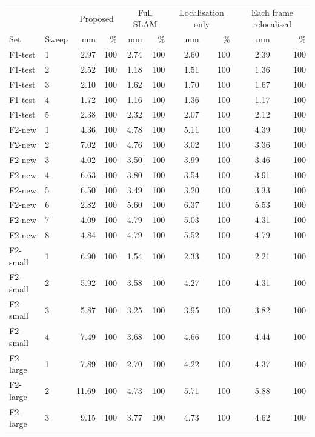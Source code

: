\begin{longtable}{llrrrrrrrr}
\toprule
 & & \multicolumn{2}{c}{Proposed} & \multicolumn{2}{c}{Full SLAM} & \multicolumn{2}{c}{Localisation only} & \multicolumn{2}{c}{Each frame relocalised}\\
Set & Sweep & mm & \% & mm & \% & mm & \% & mm & \%\\
\midrule
\endhead
\bottomrule
\endfoot
F1-test & 1 & 2.97 & 100 & 2.74 & 100 & 2.60 & 100 & 2.39 & 100\\
F1-test & 2 & 2.52 & 100 & 1.18 & 100 & 1.51 & 100 & 1.36 & 100\\
F1-test & 3 & 2.10 & 100 & 1.62 & 100 & 1.70 & 100 & 1.67 & 100\\
F1-test & 4 & 1.72 & 100 & 1.16 & 100 & 1.36 & 100 & 1.17 & 100\\
F1-test & 5 & 2.38 & 100 & 2.32 & 100 & 2.07 & 100 & 2.12 & 100\\
\midrule
F2-new & 1 & 4.36 & 100 & 4.78 & 100 & 5.11 & 100 & 4.39 & 100\\
F2-new & 2 & 7.02 & 100 & 4.76 & 100 & 3.02 & 100 & 3.36 & 100\\
F2-new & 3 & 4.02 & 100 & 3.50 & 100 & 3.99 & 100 & 3.46 & 100\\
F2-new & 4 & 6.63 & 100 & 3.80 & 100 & 3.54 & 100 & 3.91 & 100\\
F2-new & 5 & 6.50 & 100 & 3.49 & 100 & 3.20 & 100 & 3.33 & 100\\
F2-new & 6 & 2.82 & 100 & 5.60 & 100 & 6.37 & 100 & 5.53 & 100\\
F2-new & 7 & 4.09 & 100 & 4.79 & 100 & 5.03 & 100 & 4.31 & 100\\
F2-new & 8 & 4.84 & 100 & 4.79 & 100 & 5.52 & 100 & 4.79 & 100\\
\midrule
F2-small & 1 & 6.90 & 100 & 1.54 & 100 & 2.33 & 100 & 2.21 & 100\\
F2-small & 2 & 5.92 & 100 & 3.58 & 100 & 4.27 & 100 & 4.31 & 100\\
F2-small & 3 & 5.87 & 100 & 3.25 & 100 & 3.95 & 100 & 3.82 & 100\\
F2-small & 4 & 7.49 & 100 & 3.68 & 100 & 4.66 & 100 & 4.44 & 100\\
\midrule
F2-large & 1 & 7.89 & 100 & 2.70 & 100 & 4.22 & 100 & 4.37 & 100\\
F2-large & 2 & 11.69 & 100 & 4.73 & 100 & 5.71 & 100 & 5.88 & 100\\
F2-large & 3 & 9.15 & 100 & 3.77 & 100 & 4.73 & 100 & 4.62 & 100\\

\end{longtable}
